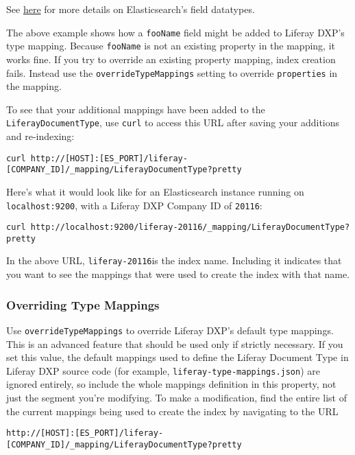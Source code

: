 See
\href{https://www.elastic.co/guide/en/elasticsearch/reference/6.5/mapping-types.html}{here}
for more details on Elasticsearch's field datatypes.

The above example shows how a \texttt{fooName} field might be added to
Liferay DXP's type mapping. Because \texttt{fooName} is not an existing
property in the mapping, it works fine. If you try to override an
existing property mapping, index creation fails. Instead use the
\texttt{overrideTypeMappings} setting to override \texttt{properties} in
the mapping.

To see that your additional mappings have been added to the
\texttt{LiferayDocumentType}, use \texttt{curl} to access this URL after
saving your additions and re-indexing:

\begin{verbatim}
curl http://[HOST]:[ES_PORT]/liferay-[COMPANY_ID]/_mapping/LiferayDocumentType?pretty
\end{verbatim}

Here's what it would look like for an Elasticsearch instance running on
\texttt{localhost:9200}, with a Liferay DXP Company ID of
\texttt{20116}:

\begin{verbatim}
curl http://localhost:9200/liferay-20116/_mapping/LiferayDocumentType?pretty
\end{verbatim}

In the above URL, \texttt{liferay-20116}is the index name. Including it
indicates that you want to see the mappings that were used to create the
index with that name.

\subsubsection{Overriding Type Mappings}\label{overriding-type-mappings}

Use \texttt{overrideTypeMappings} to override Liferay DXP's default type
mappings. This is an advanced feature that should be used only if
strictly necessary. If you set this value, the default mappings used to
define the Liferay Document Type in Liferay DXP source code (for
example, \texttt{liferay-type-mappings.json}) are ignored entirely, so
include the whole mappings definition in this property, not just the
segment you're modifying. To make a modification, find the entire list
of the current mappings being used to create the index by navigating to
the URL

\begin{verbatim}
http://[HOST]:[ES_PORT]/liferay-[COMPANY_ID]/_mapping/LiferayDocumentType?pretty
\end{verbatim}

